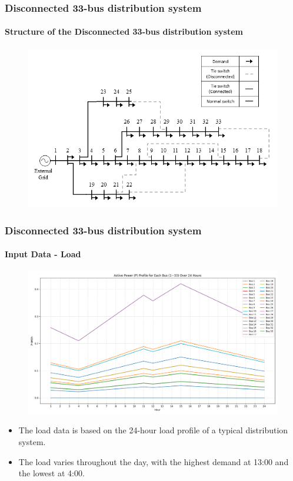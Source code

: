 \documentclass[
	11pt, %
	aspectratio=169, %
]{beamer}
\begin{document}
\begin{frame}
	\frametitle{Disconnected 33-bus distribution system}
	\framesubtitle{Structure of the Disconnected 33-bus distribution system}

	\begin{figure}
		\includegraphics[width=4 in,keepaspectratio]{modified_33_bus_disc.png}
	\end{figure}

	
\end{frame}



\begin{frame}
	\frametitle{Disconnected 33-bus distribution system}
	\framesubtitle{Input Data - Load}

	\begin{figure}
		\includegraphics[width=3 in,keepaspectratio]{../fig/Load_P.png}
	\end{figure}

	\begin{itemize}
		\item The load data is based on the 24-hour load profile of a typical distribution system.
		\item The load varies throughout the day, with the highest demand at 13:00 and the lowest at 4:00.
	\end{itemize}

	
\end{frame}
\end{document}
